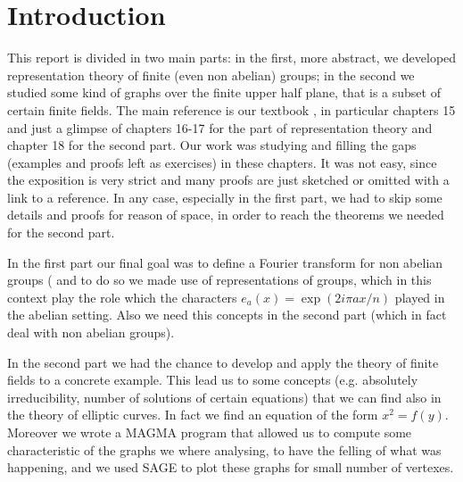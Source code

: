 \section{Introduction}
This report is divided in two main parts: in the first, more abstract, we developed representation theory of finite 
(even non abelian) groups; in the second we studied some kind of graphs over the finite upper half plane, that is a subset of
certain finite fields. The main reference is our textbook \cite{terras_1999}, in particular chapters 
15 and just a glimpse of chapters 16-17 for the part of representation theory and chapter 18 for the second part.
Our work was studying and filling the gaps (examples and proofs left as exercises) in these chapters. It was not easy,
since the exposition is very strict and many proofs are just sketched or omitted with a link to a reference. In any case,
especially in the first part, we had to skip some details and proofs for reason of space, in order to reach the 
theorems we needed for the second part.

In the first part our final goal was to define a Fourier transform for non abelian groups ( and to do so we made use of representations of groups, which in this context play the role which the characters $e_a(x)=\exp(2i\pi ax/n)$ played in the abelian setting. Also we need this concepts in the second part (which in fact deal with non abelian groups).

In the second part we had the chance to develop and apply the theory of finite fields
to a concrete example. This lead us to some concepts (e.g. absolutely irreducibility, number of solutions of certain equations)
that we can find also in the theory of elliptic curves. In fact we find an equation of the form $x^2=f(y)$.
Moreover we wrote a MAGMA program that allowed us to compute some characteristic of the graphs we where analysing, to have 
the felling of what was happening, and we used SAGE to plot these graphs for small number of vertexes.